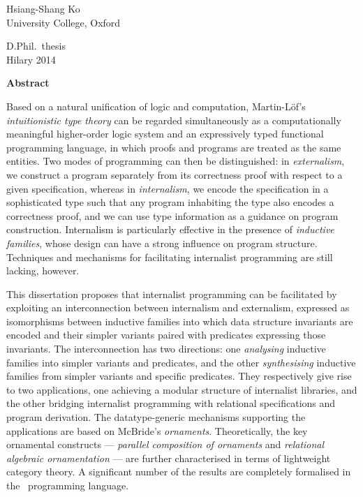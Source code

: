 \documentclass[dissertation]{subfiles}
\begin{document}

\thispagestyle{empty}

\hypertarget{abstract}{}

\begin{center}


Hsiang-Shang Ko\\
University College, Oxford

D.Phil.~thesis\\
Hilary 2014

\end{center}

\noindent\hfil\textbf{Abstract}\hfil

\noindent
Based on a natural unification of logic and computation, Martin-Löf's \textit{intuitionistic type theory} can be regarded simultaneously as a computationally meaningful higher-order logic system and an expressively typed functional programming language, in which proofs and programs are treated as the same entities.
Two modes of programming can then be distinguished: in \textit{externalism}, we construct a program separately from its correctness proof with respect to a given specification, whereas in \textit{internalism}, we encode the specification in a sophisticated type such that any program inhabiting the type also encodes a correctness proof, and we can use type information as a guidance on program construction.
Internalism is particularly effective in the presence of \textit{inductive families}, whose design can have a strong influence on program structure.
Techniques and mechanisms for facilitating internalist programming are still lacking, however.

This dissertation proposes that internalist programming can be facilitated by exploiting an interconnection between internalism and externalism, expressed as isomorphisms between inductive families into which data structure invariants are encoded and their simpler variants paired with predicates expressing those invariants.
The interconnection has two directions: one \textit{analysing} inductive families into simpler variants and predicates, and the other \textit{synthesising} inductive families from simpler variants and specific predicates.
They respectively give rise to two applications, one achieving a modular structure of internalist libraries, and the other bridging internalist programming with relational specifications and program derivation.
The datatype-generic mechanisms supporting the applications are based on McBride's \textit{ornaments}.
Theoretically, the key ornamental constructs --- \textit{parallel composition of ornaments} and \textit{relational algebraic ornamentation} --- are further characterised in terms of lightweight category theory.
A significant number of the results are completely formalised in the \Agda\ programming language.
\end{document}
